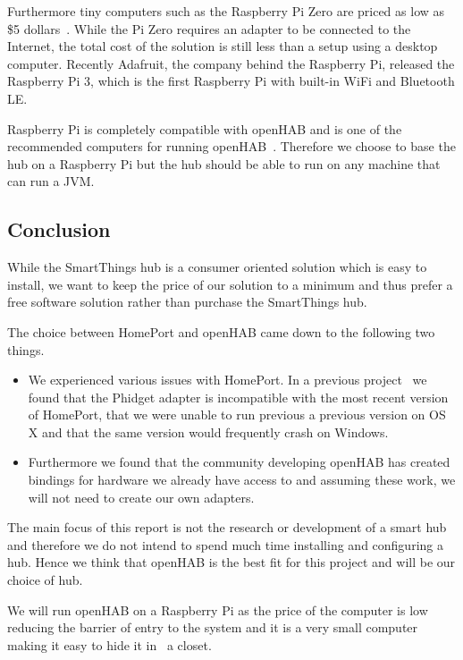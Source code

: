Furthermore tiny computers such as the Raspberry Pi Zero are priced as low as \$5 dollars~\cite{raspberrypi:zero}. While the Pi Zero requires an adapter to be connected to the Internet, the total cost of the solution is still less than a setup using a desktop computer. Recently Adafruit, the company behind the Raspberry Pi, released the Raspberry Pi 3, which is the first Raspberry Pi with built-in WiFi and Bluetooth LE.

Raspberry Pi is completely compatible with openHAB and is one of the recommended computers for running openHAB~\cite{openhab:hardware}. Therefore we choose to base the hub on a Raspberry Pi but the hub should be able to run on any machine that can run a JVM.

\subsection{Conclusion}
\label{sec:analysis:choice-of-hub:conclusion}

While the SmartThings hub is a consumer oriented solution which is easy to install, we want to keep the price of our solution to a minimum and thus prefer a free software solution rather than purchase the SmartThings hub.

The choice between HomePort and openHAB came down to the following two things.

\begin{itemize}
\item We experienced various issues with HomePort. In a previous project~\cite{prespecialisation} we found that the Phidget adapter is incompatible with the most recent version of HomePort, that we were unable to run previous a previous version on OS X and that the same version would frequently crash on Windows.
\item Furthermore we found that the community developing openHAB has created bindings for hardware we already have access to and assuming these work, we will not need to create our own adapters.
\end{itemize}

The main focus of this report is not the research or development of a smart hub and therefore we do not intend to spend much time installing and configuring a hub. Hence we think that openHAB is the best fit for this project and will be our choice of hub.

We will run openHAB on a Raspberry Pi as the price of the computer is low reducing the barrier of entry to the system and it is a very small computer making it easy to hide it in \eg~a closet.

